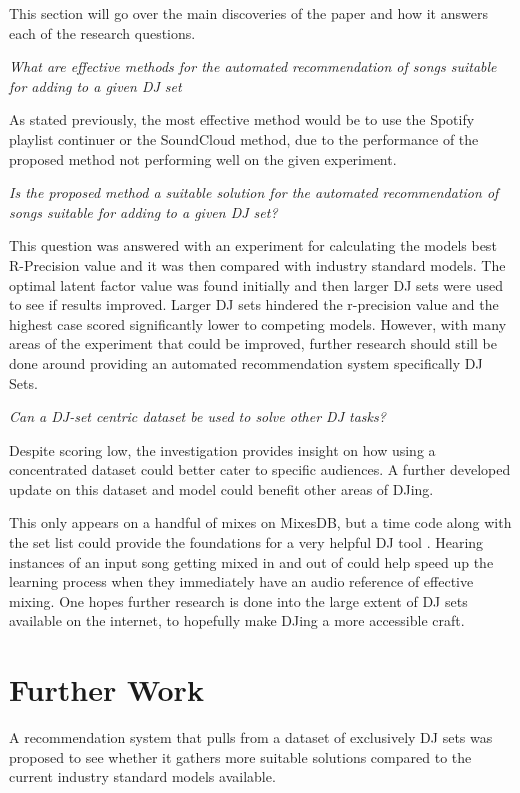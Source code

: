 This section will go over the main discoveries of the paper and how it answers each of the research questions.

	\textit{What are effective methods for the automated recommendation of songs suitable
		for adding to a given DJ set}

As stated previously, the most effective method would be to use the Spotify playlist continuer or the SoundCloud method, due to the performance of the proposed method not performing well on the given experiment. 

\break
	\textit{Is the proposed method a suitable solution for the automated recommendation of songs suitable for adding to a given DJ set?}

This question was answered with an experiment for calculating the models best R-Precision value and it was then compared with industry standard models. The optimal latent factor value was found initially and then larger DJ sets were used to see if results improved. Larger DJ sets hindered the r-precision value and the highest case scored significantly lower to competing models. However, with many areas of the experiment that could be improved, further research should still be done  around providing an automated recommendation system specifically DJ Sets.

\textit{Can a DJ-set centric dataset be used to solve other DJ tasks?}


Despite scoring low, the investigation provides insight on how using a concentrated dataset could better cater to specific audiences. A further developed update on this dataset and model could benefit other areas of DJing. 

This only appears on a handful of mixes on MixesDB, but a time code along with the set list could provide the foundations for a very helpful DJ tool \citep{mixesdb_2015-01-02_2015}. Hearing instances of an input song getting mixed in and out of could help speed up the learning process when they immediately have an audio reference of effective mixing. One hopes further research is done into the large extent of DJ sets available on the internet, to hopefully make DJing a more accessible craft. 

\section{Further Work}

A recommendation system that pulls from a dataset of exclusively DJ sets was proposed to see whether it gathers more suitable solutions compared to the current industry standard models available. 

